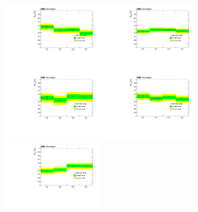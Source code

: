 \begin{figure}
    \centering
    \includegraphics[width=0.45\textwidth]{figure/SimAcp_16_el_ttbar_chi2_20_opt_150.pdf}
    \includegraphics[width=0.45\textwidth]{figure/SimAcp_16_mu_ttbar_chi2_20_opt_150.pdf}
    \includegraphics[width=0.45\textwidth]{figure/SimAcp_17_el_ttbar_chi2_20_opt_150.pdf}
    \includegraphics[width=0.45\textwidth]{figure/SimAcp_17_mu_ttbar_chi2_20_opt_150.pdf}
    \includegraphics[width=0.45\textwidth]{figure/SimAcp_18_el_ttbar_chi2_20_opt_150.pdf}

\end{figure}
